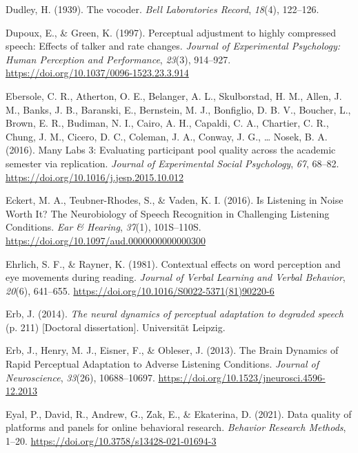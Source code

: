 \documentclass[a4paper, nobind]{templates/ociamthesis}
\newlength{\cslhangindent}
\newenvironment{CSLReferences}[2] %
 {%
  \setlength{\parindent}{0pt}
  \ifodd #1
  \let\oldpar\par
  \def\par{\hangindent=\cslhangindent\oldpar}
  \fi
  \setlength{\parskip}{1mm}
  \setlength{\baselineskip}{6mm}
 }%
 {}
\begin{document}
\begin{CSLReferences}{1}{0}
\leavevmode{}%
Dudley, H. (1939). {The vocoder}. \emph{Bell Laboratories Record}, \emph{18}(4), 122--126.

\leavevmode{}%
Dupoux, E., \& Green, K. (1997). Perceptual adjustment to highly compressed speech: Effects of talker and rate changes. \emph{Journal of Experimental Psychology: Human Perception and Performance}, \emph{23}(3), 914--927. \url{https://doi.org/10.1037/0096-1523.23.3.914}

\leavevmode{}%
Ebersole, C. R., Atherton, O. E., Belanger, A. L., Skulborstad, H. M., Allen, J. M., Banks, J. B., Baranski, E., Bernstein, M. J., Bonfiglio, D. B. V., Boucher, L., Brown, E. R., Budiman, N. I., Cairo, A. H., Capaldi, C. A., Chartier, C. R., Chung, J. M., Cicero, D. C., Coleman, J. A., Conway, J. G., \ldots{} Nosek, B. A. (2016). {Many Labs 3: Evaluating participant pool quality across the academic semester via replication}. \emph{Journal of Experimental Social Psychology}, \emph{67}, 68--82. \url{https://doi.org/10.1016/j.jesp.2015.10.012}

\leavevmode{}%
Eckert, M. A., Teubner-Rhodes, S., \& Vaden, K. I. (2016). Is Listening in Noise Worth It? The Neurobiology of Speech Recognition in Challenging Listening Conditions. \emph{Ear \& Hearing}, \emph{37}(1), 101S--110S. \url{https://doi.org/10.1097/aud.0000000000000300}

\leavevmode{}%
Ehrlich, S. F., \& Rayner, K. (1981). {Contextual effects on word perception and eye movements during reading}. \emph{Journal of Verbal Learning and Verbal Behavior}, \emph{20}(6), 641--655. \url{https://doi.org/10.1016/S0022-5371(81)90220-6}

\leavevmode{}%
Erb, J. (2014). \emph{{The neural dynamics of perceptual adaptation to degraded speech}} (p. 211) {[}Doctoral dissertation{]}. Universit{ä}t Leipzig.

\leavevmode{}%
Erb, J., Henry, M. J., Eisner, F., \& Obleser, J. (2013). The Brain Dynamics of Rapid Perceptual Adaptation to Adverse Listening Conditions. \emph{Journal of Neuroscience}, \emph{33}(26), 10688--10697. \url{https://doi.org/10.1523/jneurosci.4596-12.2013}

\leavevmode{}%
Eyal, P., David, R., Andrew, G., Zak, E., \& Ekaterina, D. (2021). {Data quality of platforms and panels for online behavioral research}. \emph{Behavior Research Methods}, 1--20. \url{https://doi.org/10.3758/s13428-021-01694-3}


\end{CSLReferences}
\end{document}
